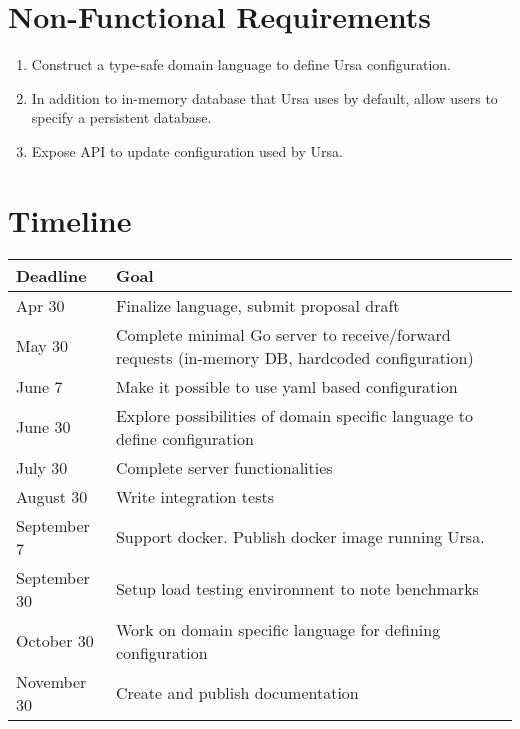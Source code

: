 \documentclass{article}
\begin{document}
%
%
\section{Non-Functional Requirements}
\begin{enumerate}
    \item
          Construct a type-safe domain language to define Ursa configuration.
    \item
          In addition to in-memory database that Ursa uses by default, allow users to
          specify a persistent database.
    \item
          Expose API to update configuration used by Ursa.
\end{enumerate}

%
%
\section{Timeline}
\begin{tabular}{||m{2cm} | m{10cm} ||}
    \hline
    Deadline     & Goal                                                                                           \\
    \hline \hline
    Apr 30       & Finalize language, submit proposal draft                                                       \\
    \hline
    May 30       & Complete minimal Go server to receive/forward requests (in-memory DB, hardcoded configuration) \\
    \hline
    June 7       & Make it possible to use yaml based configuration                                               \\
    \hline
    June 30      & Explore possibilities of domain specific language to define configuration                      \\
    \hline
    July 30      & Complete server functionalities                                                                \\
    \hline
    August 30    & Write integration tests                                                                        \\
    \hline
    September 7  & Support docker. Publish docker image running Ursa.                                                                   \\
    \hline
    September 30 & Setup load testing environment to note benchmarks                                           \\
    \hline
    October 30   & Work on domain specific language for defining configuration                                             \\
    \hline
    November 30  & Create and publish documentation                                                               \\
    \hline
\end{tabular}
\end{document}
